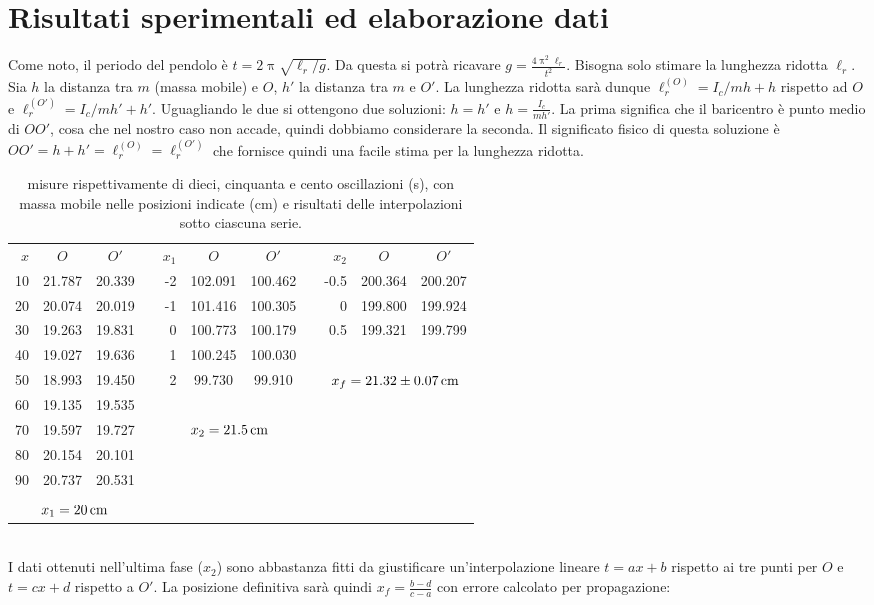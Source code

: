 \documentclass[italian,a4paper]{article}
\renewcommand{\pi}{\uppi} %
\begin{document}
\section{Risultati sperimentali ed elaborazione dati}
Come noto, il periodo del pendolo è $t=2\pi\sqrt{\ell_r/g}$. Da questa si potrà ricavare $g=\frac{4\pi^2\ell_r}{t^2}$. Bisogna solo stimare la lunghezza ridotta $\ell_r$. Sia $h$ la distanza tra $m$ (massa mobile) e $O$, $h'$ la distanza tra $m$ e $O'$. La lunghezza ridotta sarà dunque $\ell_r^{(O)} = I_c/mh +h$ rispetto ad $O$ e $\ell_r^{(O')} = I_c/mh' +h'$. Uguagliando le due si ottengono due soluzioni: $h=h'$ e $h=\frac{I_c}{mh'}$. La prima significa che il baricentro è punto medio di $OO'$, cosa che nel nostro caso non accade, quindi dobbiamo considerare la seconda. Il significato fisico di questa soluzione è $OO' = h + h' = \ell_r^{(O)} = \ell_r^{(O')}$ che fornisce quindi una facile stima per la lunghezza ridotta.
\begin{table}[h]\caption{misure rispettivamente di dieci, cinquanta e cento oscillazioni (\unit{s}), con massa mobile nelle posizioni indicate (\unit{cm}) e risultati delle interpolazioni sotto ciascuna serie.}\label{cinzia}
\centering
\begin{tabular}{rcccrcccrcc}
 $x$	&$O$	&$O'$	&	&$x_1$	&$O$	&$O'$	&	&$x_2$	&$O$	&$O'$\\\cline{1-3}\cline{5-7}\cline{9-11}
10	&21.787	&20.339	&	&-2	&102.091&100.462&	&-0.5	&200.364&200.207\\
20	&20.074	&20.019	&	&-1	&101.416&100.305&	&0	&199.800&199.924\\
30	&19.263	&19.831	&	&0	&100.773&100.179&	&0.5	&199.321&199.799\\
40	&19.027	&19.636	&	&1	&100.245&100.030&	&	&	& \\
50	&18.993	&19.450	&	&2	&99.730	&99.910	&	&\multicolumn{3}{c}{$x_f=\unit[21.32\pm0.07]{cm}$}\\
60	&19.135	&19.535	&	&	&	&	&	&	&	& \\
70	&19.597	&19.727	&	&\multicolumn{3}{c}{$x_2=\unit[21.5]{cm}$}&	&	&	& \\
80	&20.154	&20.101	&	&	&	&	&	&	&	& \\
90	&20.737	&20.531	&	&	&	&	&	&	&	& \\
\\
\multicolumn{3}{c}{$x_1=\unit[20]{cm}$}
\end{tabular}
\end{table}\\
I dati ottenuti nell'ultima fase ($x_2$) sono abbastanza fitti da giustificare un'interpolazione lineare $t=ax+b$ rispetto ai tre punti per $O$ e $t=cx+d$ rispetto a $O'$. La posizione definitiva sarà quindi $x_f = \frac{b-d}{c-a}$ con errore calcolato per propagazione:
\end{document}
